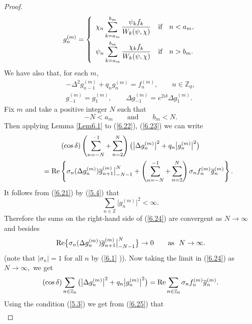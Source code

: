 \documentclass[pdftex]{sigma}
\numberwithin{equation}{section}
\begin{document}
\begin{proof}
\begin{gather}
g_{n}^{(m)}=\left\{
\begin{array}{lll}
\displaystyle \chi _{n}\sum_{k=a_{m}}^{b_{m}}\frac{\psi _{k}f_{k}}{W_{k}(\psi ,\chi )} &
\text{if} & n<a_{m}, \vspace{1mm}\\
\displaystyle \psi _{n}\sum_{k=a_{m}}^{b_{m}}\frac{\chi _{k}f_{k}}{W_{k}(\psi ,\chi )} &
\text{if} & n>b_{m}.%
\end{array}%
\right.  \label{6.21}
\end{gather}%
We have also that, for each $m,$%
\begin{gather}
-\Delta ^{2}g_{n-1}^{(m)}+q_{n}g_{n}^{(m)}=f_{n}^{(m)},\qquad n\in
\mathbb{Z}
_{0},  \label{6.22}
\\
g_{-1}^{(m)}=g_{1}^{(m)},\qquad \Delta g_{-1}^{(m)}=e^{2i\delta }\Delta
g_{1}^{(m)}.  \label{6.23}
\end{gather}%
Fix $m$ and take a positive integer $N$ such that%
\[
-N<a_{m}\qquad \text{and} \qquad b_{m}<N.
\]%
Then applying Lemma \ref{Lem6.1} to (\ref{6.22}), (\ref{6.23}) we can write%
\begin{gather}
(\cos \delta )\left( \sum_{n=-N}^{-1}+\sum_{n=2}^{N}\right) \big(
\big\vert \Delta g_{n}^{(m)}\big\vert ^{2}+q_{n}\big\vert
g_{n}^{(m)}\big\vert ^{2}\big)  \nonumber \\
\qquad {}= {\rm Re}\left\{ \sigma _{n}(\Delta g_{n}^{(m)})\overline{g}%
_{n+1}^{(m)}\big| _{-N-1}^{N}+\left( \sum_{n=-N}^{-1}+\sum_{n=2}^{N}\right)
\sigma _{n}f_{n}^{(m)}\overline{g}_{n}^{(m)}\right\} .  \label{6.24}
\end{gather}%
It follows from (\ref{6.21}) by (\ref{5.4}) that%
\[
\sum_{n\in
\mathbb{Z}
}\big\vert g_{n}^{(m)}\big\vert ^{2}<\infty.
\]
Therefore the sums on the right-hand side of (\ref{6.24}) are convergent as $%
N\rightarrow \infty $ and besides%
\[
{\rm Re}\big\{ \sigma _{n}(\Delta g_{n}^{(m)})\overline{g}_{n+1}^{(m)}\big|
_{-N-1}^{N}\big\} \rightarrow 0\qquad \text{as} \ \  N\rightarrow \infty .
\]%
(note that $\left\vert \sigma _{n}\right\vert =1$ for all $n$ by (\ref{6.1}%
)). Now taking the limit in (\ref{6.24}) as $N\rightarrow \infty ,$ we get%
\begin{equation}
(\cos \delta )\sum_{n\in
\mathbb{Z}
_{0}}\big( \big\vert \Delta g_{n}^{(m)}\big\vert ^{2}+q_{n}\big\vert
g_{n}^{(m)}\big\vert ^{2}\big) ={\rm Re}\sum_{n\in
\mathbb{Z}
_{0}}\sigma _{n}f_{n}^{(m)}\overline{g}_{n}^{(m)}.  \label{6.25}
\end{equation}%
Using the condition (\ref{5.3}) we get from (\ref{6.25}) that%
\begin{gather*}

\end{gather*}
\end{proof}
\end{document}
